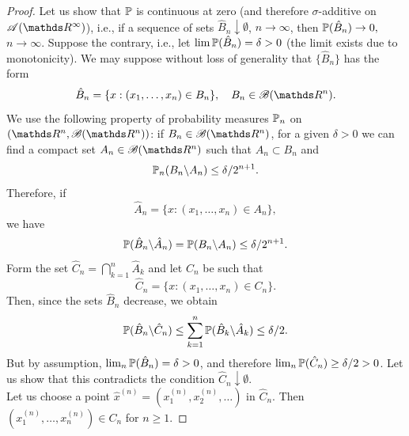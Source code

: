 \begin{unexaminable}
\begin{proof}
Let us show that $\mathbb{P}$ is continuous at zero (and therefore $\sigma$-additive on $\mathcal{A}(\R^\infty)$), i.e., if a sequence of sets $\hat{B}_n \downarrow \emptyset$, $n \to \infty$, then $\mathbb{P}(\hat{B}_n) \to 0,$ $n\to \infty$. Suppose the contrary, i.e., let $\lim \mathbb{P}(\hat{B}_n) = \delta > 0$ (the limit exists due to monotonicity). We may suppose without loss of generality that $\{\hat{B}_n\}$ has the form 
\begin{equation*}
    \hat{B}_n = \{ x : (x_1, \dots , x_n) \in B_n \}, \quad B_n \in \B(\R^n).
\end{equation*}
We use the following property of probability measures $\mathbb{P}_n$ on $(\R^n, \B(\R^n))$: if $B_n \in \B(\R^n)$, for a given $\delta > 0$ we can find a compact set $A_n \in \B(\R^n)$ such that $A_n \subset B_n$ and
\begin{equation*}
    \mathbb{P}_n(B_n \backslash A_n) \le \delta/ 2^{n+1}.
\end{equation*}
Therefore, if 
\begin{equation*}
    \hat{A}_n = \{ x:(x_1, \dots, x_n) \in A_n\},
\end{equation*}
we have
\begin{equation*}
    \mathbb{P}(\hat{B}_n \backslash \hat{A}_n) = \mathbb{P}(B_n \backslash A_n) \le \delta/ 2^{n+1}.
\end{equation*}
Form the set $\hat{C}_n = \bigcap_{k=1}^n \hat{A}_k$ and let $C_n$ be such that 
\begin{equation*}
    \hat{C}_n = \{ x: (x_1, \dots, x_n) \in C_n \}.
\end{equation*}
Then, since the sets $\hat{B}_n$ decrease, we obtain 
\begin{equation*}
    \mathbb{P}(\hat{B}_n \backslash \hat{C}_n) \le \sum_{k=1}^n \mathbb{P}(\hat{B}_k \backslash \hat{A}_k) \le \delta/2.
\end{equation*}
But by assumption, $\lim_n \mathbb{P}(\hat{B}_n) = \delta > 0$, and therefore $\lim_n \mathbb{P}(\hat{C}_n) \ge \delta/2 > 0$. Let us show that this contradicts the condition $\hat{C}_n \downarrow \emptyset$.\\

Let us choose a point $\hat{x}^{(n)} = (x_1^{(n)}, x_2^{(n)},\dots)$ in $\hat{C}_n$. Then $(x_1^{(n)}, \dots, x_n^{(n)}) \in C_n$ for $n\ge 1$.


\end{proof}
\end{unexaminable}
